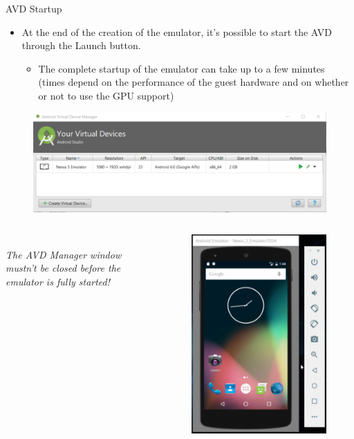 \documentclass{beamer}
\begin{document}
  \begin{frame}[allowframebreaks]{AVD Startup}
    \begin{itemize}
      \item At the end of the creation of the emulator, it's possible to start
      the AVD through the Launch button.
      \begin{itemize}
        \item The complete startup of the emulator can take up to a few minutes
        (times depend on the performance of the guest hardware and on whether or
        not to use the GPU support) 
      \end{itemize}
    \end{itemize}
    \begin{figure}
      \includegraphics[width=1\linewidth]{figures/avd-6.png}
    \end{figure}

    \begin{columns}[c,onlytextwidth]
        \centering {}\\\emph{The AVD Manager window mustn't be
        closed before the emulator is fully started!}
      \begin{figure}
        \includegraphics[width=0.55\linewidth]{figures/avd-7.png}
      \end{figure}
    \end{columns}
  \end{frame}
\end{document}
